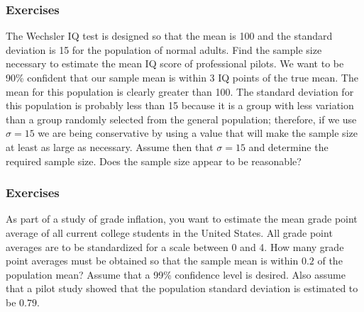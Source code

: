 \documentclass[xcolor=dvipsnames]{beamer}
\begin{document}

	

\begin{frame}
  \frametitle{Exercises}
  {\ubung} The Wechsler IQ test is designed so that the mean is
  100 and the standard deviation is 15 for the population of
  normal adults. Find the sample size necessary to estimate the
  mean IQ score of professional pilots. We want to be 90\%
  confident that our sample mean is within 3 IQ points of the true
  mean. The mean for this population is clearly greater than 100.
  The standard deviation for this population is probably less than
  15 because it is a group with less variation than a group
  randomly selected from the general population; therefore, if we
  use $\sigma=15$ we are being conservative by using a value that
  will make the sample size at least as large as necessary. Assume
  then that $\sigma=15$ and determine the required sample size.
  Does the sample size appear to be reasonable?
\end{frame}

\begin{frame}
  \frametitle{Exercises}
  {\ubung} As part of a study of grade inflation, you want to
  estimate the mean grade point average of all current college
  students in the United States. All grade point averages are to
  be standardized for a scale between 0 and 4. How many grade
  point averages must be obtained so that the sample mean is
  within $0.2$ of the population mean? Assume that a 99\%
  confidence level is desired. Also assume that a pilot study
  showed that the population standard deviation is estimated to be
  $0.79$. 
\end{frame}
\end{document}
